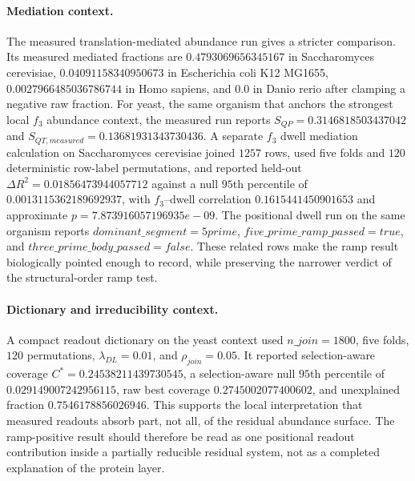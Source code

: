 \paragraph{Mediation context.}
The measured translation-mediated abundance run gives a stricter comparison. Its measured mediated fractions are $0.4793069656345167$ in Saccharomyces cerevisiae, $0.04091158340950673$ in Escherichia coli K12 MG1655, $0.0027966485036786744$ in Homo sapiens, and $0.0$ in Danio rerio after clamping a negative raw fraction. For yeast, the same organism that anchors the strongest local $f_3$ abundance context, the measured run reports $S_{QP} = 0.3146818503437042$ and $S_{QT,measured} = 0.13681931343730436$. A separate $f_3$ dwell mediation calculation on Saccharomyces cerevisiae joined $1257$ rows, used five folds and $120$ deterministic row-label permutations, and reported held-out $\Delta R^2 = 0.01856473944057712$ against a null $95$th percentile of $0.0013115362189692937$, with $f_3$--dwell correlation $0.1615441450901653$ and approximate $p = 7.873916057196935e-09$. The positional dwell run on the same organism reports $dominant\_segment = 5prime$, $five\_prime\_ramp\_passed = true$, and $three\_prime\_body\_passed = false$. These related rows make the ramp result biologically pointed enough to record, while preserving the narrower verdict of the structural-order ramp test.

\paragraph{Dictionary and irreducibility context.}
A compact readout dictionary on the yeast context used $n\_{join}=1800$, five folds, $120$ permutations, $\lambda_{DL}=0.01$, and $\rho_{join}=0.05$. It reported selection-aware coverage $C^{*}=0.24538211439730545$, a selection-aware null $95$th percentile of $0.029149007242956115$, raw best coverage $0.2745002077400602$, and unexplained fraction $0.7546178856026946$. This supports the local interpretation that measured readouts absorb part, not all, of the residual abundance surface. The ramp-positive result should therefore be read as one positional readout contribution inside a partially reducible residual system, not as a completed explanation of the protein layer.


